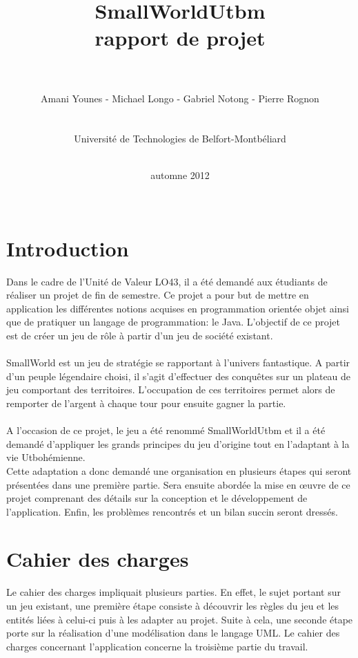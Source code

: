 \documentclass[a4paper, 11pt]{article}
\title{\vspace{5cm}SmallWorldUtbm \\ rapport de projet \\ \ \\}
\date{automne 2012\\ \ \\}
\author{Amani Younes - Michael Longo - Gabriel Notong - Pierre Rognon \\ \ \\ \ \\ Université de Technologies de Belfort-Montbéliard\\ \ \\}
\begin{document}
	
	\maketitle
	
	\newpage
	
	\tableofcontents
	
	\newpage
	
	\section*{Introduction}
	
	Dans le cadre de l'Unité de Valeur LO43, il a été demandé aux étudiants de réaliser un projet de fin de semestre. Ce projet a pour but de mettre en application les différentes notions acquises en programmation orientée objet ainsi que de pratiquer un langage de programmation: le Java. L'objectif de ce projet est de créer un jeu de rôle à partir d'un jeu de société existant.
	\paragraph{} SmallWorld est un jeu de stratégie se rapportant à l'univers fantastique. A partir d'un peuple légendaire choisi, il s'agit d'effectuer des conquêtes sur un plateau de jeu comportant des territoires. L'occupation de ces territoires permet alors de remporter de l'argent à chaque tour pour ensuite gagner la partie. 
	\paragraph{}A l'occasion de ce projet, le jeu a été renommé SmallWorldUtbm et il a été demandé d'appliquer les grands principes du jeu d'origine tout en l'adaptant à la vie Utbohémienne. \\
	Cette adaptation a donc demandé une organisation en plusieurs étapes qui seront présentées dans une première partie. Sera ensuite abordée la mise en œuvre de ce projet comprenant des détails sur la conception et le développement de l'application. Enfin, les problèmes rencontrés et un bilan succin seront dressés.
	
	
	\newpage
	
	\section{Cahier des charges}
	
	Le cahier des charges impliquait plusieurs parties. En effet, le sujet portant sur un jeu existant, une première étape consiste à découvrir les règles du jeu et les entités liées à celui-ci puis à les adapter au projet. Suite à cela, une seconde étape porte sur la réalisation d'une modélisation dans le langage UML. Le cahier des charges concernant l'application concerne la troisième partie du travail.
	
\end{document}
